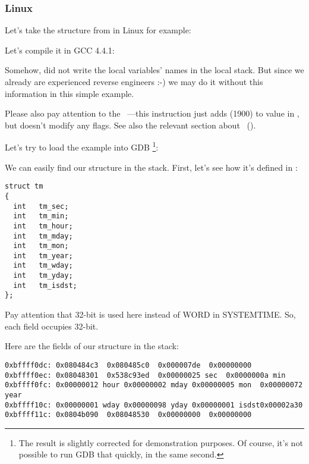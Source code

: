 ﻿\subsubsection{Linux}

Let's take the  structure from  in Linux for example:



Let's compile it in GCC 4.4.1:



Somehow, \IDA did not write the local variables' names in the local stack.
But since we already are experienced reverse engineers :-) we may do it without this information in 
this simple example.


Please also pay attention to the ~---this instruction just adds  (1900) to value in \EAX,
but doesn't modify any flags. See also the relevant section about \LEA{}~().


Let's try to load the example into GDB
\footnote{The  result is slightly corrected for demonstration purposes.
Of course, it's not possible to run GDB that quickly, in the same second.}:



We can easily find our structure in the stack.
First, let's see how it's defined in :

\begin{lstlisting}[caption=time.h, label=struct_tm,style=customc]
struct tm
{
  int	tm_sec;
  int	tm_min;
  int	tm_hour;
  int	tm_mday;
  int	tm_mon;
  int	tm_year;
  int	tm_wday;
  int	tm_yday;
  int	tm_isdst;
};
\end{lstlisting}

Pay attention that
32-bit \Tint is used here instead of WORD in SYSTEMTIME.
So, each field occupies 32-bit.

Here are the fields of our structure in the stack:

\begin{lstlisting}
0xbffff0dc:	0x080484c3	0x080485c0	0x000007de	0x00000000
0xbffff0ec:	0x08048301	0x538c93ed	0x00000025 sec	0x0000000a min
0xbffff0fc:	0x00000012 hour	0x00000002 mday	0x00000005 mon 	0x00000072 year
0xbffff10c:	0x00000001 wday	0x00000098 yday	0x00000001 isdst0x00002a30
0xbffff11c:	0x0804b090	0x08048530	0x00000000	0x00000000
\end{lstlisting}

